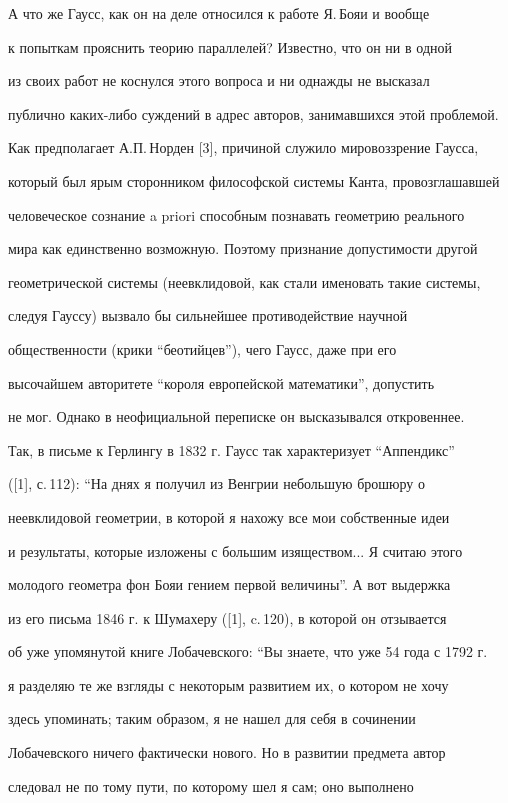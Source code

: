 А что же Гаусс, как он на деле относился к работе Я.\,Бояи и вообще 


к попыткам прояснить теорию параллелей? Известно, что он ни в одной 


из своих работ не коснулся этого вопроса и ни однажды не высказал 


публично каких-либо суждений в адрес авторов, занимавшихся этой проблемой. 


Как предполагает А.П.\,Норден [3], причиной служило мировоззрение Гаусса, 


который был ярым сторонником философской системы Канта, провозглашавшей 


человеческое сознание a priori способным познавать геометрию реального 


мира как единственно возможную. Поэтому признание допустимости другой 


геометрической системы (неевклидовой, как стали именовать такие системы, 


следуя Гауссу) вызвало бы сильнейшее противодействие научной 


общественности (крики ``беотийцев''), чего Гаусс, даже при его 


высочайшем авторитете ``короля европейской математики'', допустить 


не мог. Однако в неофициальной переписке он высказывался откровеннее.


Так, в письме к Герлингу в 1832 г. Гаусс так характеризует ``Аппендикс''


([1], с.\,112): ``На днях я получил из Венгрии небольшую брошюру о 


неевклидовой геометрии, в которой я нахожу все мои собственные идеи 


и результаты, которые изложены с большим изяществом... Я считаю этого 


молодого геометра фон Бояи гением первой величины''. А вот выдержка 


из его письма 1846 г. к Шумахеру ([1], c.\,120), в которой он отзывается 


об уже упомянутой книге Лобачевского: ``Вы знаете, что уже 54 года с 1792 г. 


я разделяю те же взгляды с некоторым развитием их, о котором не хочу 


здесь упоминать; таким образом, я не нашел для себя в сочинении 


Лобачевского ничего фактически нового. Но в развитии предмета автор 


следовал не по тому пути, по которому шел я сам; оно выполнено 



